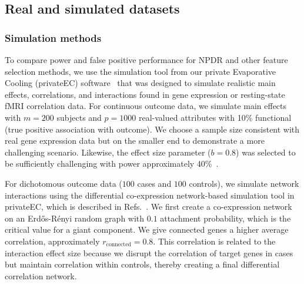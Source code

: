 \documentclass{bioinfo}
\begin{document}
\subsection{Real and simulated datasets}
\subsubsection{Simulation methods}
To compare power and false positive performance for NPDR and other feature selection methods, we use the simulation tool from our private Evaporative Cooling (privateEC) software~\cite{le17} that was designed to simulate realistic main effects, correlations, and interactions found in gene expression or resting-state fMRI correlation data.
For continuous outcome data, we simulate main effects with $m=200$ subjects and $p=1000$ real-valued attributes with 10\% functional (true positive association with outcome).
We choose a sample size consistent with real gene expression data but on the smaller end to demonstrate a more challenging scenario.
Likewise, the effect size parameter ($b=0.8$) was selected to be sufficiently challenging with power approximately 40\%~\cite{le17}.

For dichotomous outcome data ($100$ cases and $100$ controls), we simulate network interactions using the differential co-expression network-based simulation tool in privateEC, which is described in Refs.~\cite{le17, lareau15}.
We first create a co-expression network on an Erd\H{o}s-R\'enyi random graph with $0.1$ attachment probability, which is the critical value for a giant component.
We give connected genes a higher average correlation, approximately $r_{\text{connected}}=0.8$.%
This correlation is related to the interaction effect size because we disrupt the correlation of target genes in cases but maintain correlation within controls, thereby creating a final differential correlation network.
\end{document}
